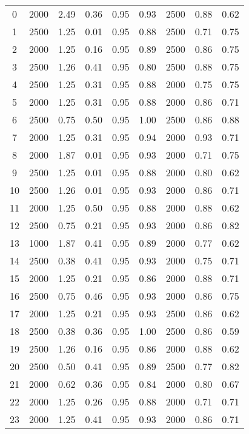 \begin{longtable}[c]{ccccccccc}
0   &  2000 &  2.49 &  0.36 &  0.95 &  0.93 &  2500 &  0.88 &  0.62 \\
1   &  2500 &  1.25 &  0.01 &  0.95 &  0.88 &  2500 &  0.71 &  0.75 \\
2   &  2000 &  1.25 &  0.16 &  0.95 &  0.89 &  2500 &  0.86 &  0.75 \\
3   &  2500 &  1.26 &  0.41 &  0.95 &  0.80 &  2500 &  0.88 &  0.75 \\
4   &  2500 &  1.25 &  0.31 &  0.95 &  0.88 &  2000 &  0.75 &  0.75 \\
5   &  2000 &  1.25 &  0.31 &  0.95 &  0.88 &  2000 &  0.86 &  0.71 \\
6   &  2500 &  0.75 &  0.50 &  0.95 &  1.00 &  2500 &  0.86 &  0.88 \\
7   &  2000 &  1.25 &  0.31 &  0.95 &  0.94 &  2000 &  0.93 &  0.71 \\
8   &  2000 &  1.87 &  0.01 &  0.95 &  0.93 &  2000 &  0.71 &  0.75 \\
9   &  2500 &  1.25 &  0.01 &  0.95 &  0.88 &  2000 &  0.80 &  0.62 \\
10  &  2500 &  1.26 &  0.01 &  0.95 &  0.93 &  2000 &  0.86 &  0.71 \\
11  &  2000 &  1.25 &  0.50 &  0.95 &  0.88 &  2000 &  0.88 &  0.62 \\
12  &  2500 &  0.75 &  0.21 &  0.95 &  0.93 &  2000 &  0.86 &  0.82 \\
13  &  1000 &  1.87 &  0.41 &  0.95 &  0.89 &  2000 &  0.77 &  0.62 \\
14  &  2500 &  0.38 &  0.41 &  0.95 &  0.93 &  2000 &  0.75 &  0.71 \\
15  &  2000 &  1.25 &  0.21 &  0.95 &  0.86 &  2000 &  0.88 &  0.71 \\
16  &  2500 &  0.75 &  0.46 &  0.95 &  0.93 &  2000 &  0.86 &  0.75 \\
17  &  2000 &  1.25 &  0.21 &  0.95 &  0.93 &  2500 &  0.86 &  0.62 \\
18  &  2500 &  0.38 &  0.36 &  0.95 &  1.00 &  2500 &  0.86 &  0.59 \\
19  &  2500 &  1.26 &  0.16 &  0.95 &  0.86 &  2000 &  0.88 &  0.62 \\
20  &  2500 &  0.50 &  0.41 &  0.95 &  0.89 &  2500 &  0.77 &  0.82 \\
21  &  2000 &  0.62 &  0.36 &  0.95 &  0.84 &  2000 &  0.80 &  0.67 \\
22  &  2000 &  1.25 &  0.26 &  0.95 &  0.88 &  2000 &  0.71 &  0.71 \\
23  &  2000 &  1.25 &  0.41 &  0.95 &  0.93 &  2000 &  0.86 &  0.71 \\

\end{longtable}
